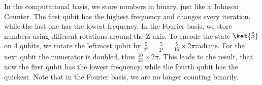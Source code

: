 In the computational basis, we store numbers in binary, just like a
Johnson Counter.
The first qubit has the highest frequency and changes every iteration,
while the last one has the lowest frequency.
In the Fourier basis, we store numbers using different rotations
around the Z-axis.
To encode the state $\ket{\tilde{5}}$ on 4 qubits, we rotate the
leftmost qubit by $\frac{5}{2^n} = \frac{5}{2^4} = \frac{5}{16}\times
2\pi \text{radians}$. For the next qubit the numerator is doubled,
thus $\frac{10}{16} \times 2\pi$.
This leads to the result, that now the first qubit has the lowest
frequency, while the fourth qubit has the quickest. Note that in the
Fourier basis, we are no longer counting binarily.
\begin{center}
\end{center}
